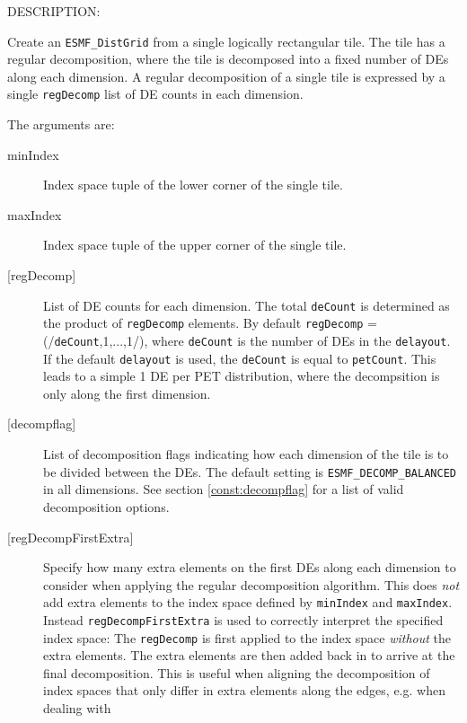 {\sf DESCRIPTION:\\ }


       Create an {\tt ESMF\_DistGrid} from a single logically rectangular tile.
       The tile has a regular decomposition, where the tile is decomposed
       into a fixed number of DEs along each dimension. A regular decomposition
       of a single tile is expressed by a single {\tt regDecomp} list of DE 
       counts in each dimension.
  
       The arguments are:
       \begin{description}
       \item[minIndex]
            Index space tuple of the lower corner of the single tile.
       \item[maxIndex]
            Index space tuple of the upper corner of the single tile.
       \item[{[regDecomp]}]
            List of DE counts for each dimension. The total {\tt deCount} is
            determined as the product of {\tt regDecomp} elements.
            By default {\tt regDecomp} = (/{\tt deCount},1,...,1/), 
            where {\tt deCount}
            is the number of DEs in the {\tt delayout}. If the default
            {\tt delayout} is used, the {\tt deCount} is equal to {\tt petCount}.
            This leads to a simple 1 DE per PET distribution, where the
            decompsition is only along the first dimension.
       \item[{[decompflag]}]
            List of decomposition flags indicating how each dimension of the
            tile is to be divided between the DEs. The default setting
            is {\tt ESMF\_DECOMP\_BALANCED} in all dimensions. See section
            \ref{const:decompflag} for a list of valid decomposition options.
       \item[{[regDecompFirstExtra]}]
            Specify how many extra elements on the first DEs along each 
            dimension to consider when applying the regular decomposition 
            algorithm. This does {\em not} add extra elements to the 
            index space defined by {\tt minIndex} and {\tt maxIndex}. Instead
            {\tt regDecompFirstExtra} is used to correctly interpret the 
            specified index space: The {\tt regDecomp} is first applied to the
            index space {\em without} the extra elements. The extra elements are
            then added back in to arrive at the final decomposition. This is 
            useful when aligning the decomposition of index spaces that only
            differ in extra elements along the edges, e.g. when dealing with

\end{description}
